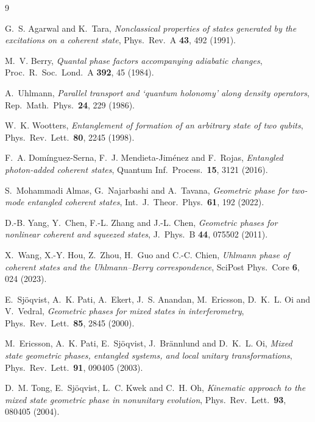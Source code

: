\documentclass[11pt]{article}
\begin{document}
\begin{thebibliography}{9}

 G.~S. Agarwal and K.~Tara,
\emph{Nonclassical properties of states generated by the excitations on a
coherent state}, Phys.\ Rev.\ A \textbf{43}, 492 (1991).

 M.~V. Berry,
\emph{Quantal phase factors accompanying adiabatic changes},
Proc.\ R.\ Soc.\ Lond.\ A \textbf{392}, 45 (1984).

 A.~Uhlmann,
\emph{Parallel transport and `quantum holonomy' along density operators},
Rep.\ Math.\ Phys.\ \textbf{24}, 229 (1986).

 W.~K. Wootters,
\emph{Entanglement of formation of an arbitrary state of two qubits},
Phys.\ Rev.\ Lett.\ \textbf{80}, 2245 (1998).

 F.~A. Dom\'inguez-Serna, F.~J. Mendieta-Jim\'enez
and F.~Rojas, \emph{Entangled photon-added coherent states},
Quantum Inf.\ Process.\ \textbf{15}, 3121 (2016).

 S.~Mohammadi Almas, G.~Najarbashi and A.~Tavana,
\emph{Geometric phase for two-mode entangled coherent states},
Int.\ J.\ Theor.\ Phys.\ \textbf{61}, 192 (2022).

 D.-B. Yang, Y.~Chen, F.-L. Zhang and J.-L. Chen,
\emph{Geometric phases for nonlinear coherent and squeezed states},
J.\ Phys.\ B \textbf{44}, 075502 (2011).

 X.~Wang, X.-Y. Hou, Z.~Zhou, H.~Guo and C.-C. Chien,
\emph{Uhlmann phase of coherent states and the Uhlmann--Berry correspondence},
SciPost Phys.\ Core \textbf{6}, 024 (2023).

 E.~Sj\"oqvist, A.~K. Pati, A.~Ekert, J.~S. Anandan,
M.~Ericsson, D.~K.~L. Oi and V.~Vedral,
\emph{Geometric phases for mixed states in interferometry},
Phys.\ Rev.\ Lett.\ \textbf{85}, 2845 (2000).

 M.~Ericsson, A.~K. Pati, E.~Sj\"oqvist, J.~Br\"annlund
and D.~K.~L. Oi,
\emph{Mixed state geometric phases, entangled systems, and local unitary
transformations},
Phys.\ Rev.\ Lett.\ \textbf{91}, 090405 (2003).

 D.~M. Tong, E.~Sj\"oqvist, L.~C. Kwek and C.~H. Oh,
\emph{Kinematic approach to the mixed state geometric phase in nonunitary
evolution},
Phys.\ Rev.\ Lett.\ \textbf{93}, 080405 (2004).

\end{thebibliography}
\end{document}
